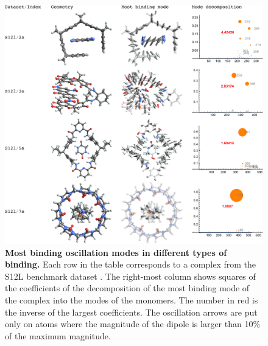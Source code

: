 \begin{figure}
\includegraphics[width=\linewidth]{media/modes-decom-1.pdf}
\caption{\textbf{Most binding oscillation modes in different types of binding.}
Each row in the table corresponds to a complex from the S12L benchmark dataset \citep{RisthausJCTC13}.
The right-most column shows squares of the coefficients of the decomposition of the most binding mode of the complex into the modes of the monomers.
The number in red is the inverse of the largest coefficients.
The oscillation arrows are put only on atoms where the magnitude of the dipole is larger than 10\% of the maximum magnitude.
}\label{fig:mbd-decom-s12l}
\end{figure}


